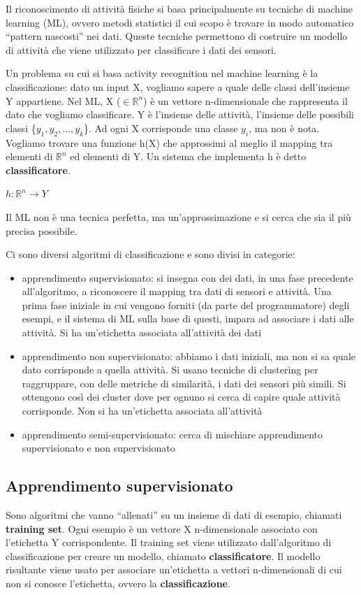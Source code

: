 Il riconoscimento di attività fisiche si basa principalmente su tecniche di machine learning (ML), ovvero metodi statistici il cui scopo è trovare in modo automatico “pattern nascosti” nei dati.
Queste tecniche permettono di costruire un modello di attività che viene utilizzato per classificare i dati dei sensori.

Un problema su cui si basa activity recognition nel machine learning è la classificazione: dato un input X, vogliamo sapere a quale 
delle classi dell'insieme Y appartiene.
Nel ML, X ($\in \mathbb{R}^n$) è un vettore n-dimensionale che rappresenta il dato che vogliamo classificare.
Y è l'insieme delle attività, l'insieme delle possibili classi \{$y_1, y_2, ..., y_k$\}.
Ad ogni X corrisponde una classe $y_i$, ma non è nota.
Vogliamo trovare una funzione h(X) che approssimi al meglio il mapping tra elementi di $\mathbb{R}^n$ ed elementi di Y. Un sistema che implementa h è detto \textbf{classificatore}.
\begin{center}
    $h: \mathbb{R}^n \rightarrow Y$
\end{center}

Il ML non è una tecnica perfetta, ma un'approssimazione e si cerca che sia il più precisa possibile.

Ci sono diversi algoritmi di classificazione e sono divisi in categorie:
\begin{itemize}
    \item apprendimento supervisionato: si insegna con dei dati, in una fase precedente all'algoritmo, a riconoscere il mapping tra dati di sensori e attività. Una prima fase iniziale in cui vengono forniti (da parte del programmatore) degli esempi, e il sistema di ML sulla base di questi, impara ad associare i dati alle attività. Si ha un'etichetta associata all'attività dei dati
    \item apprendimento non supervisionato: abbiamo i dati iniziali, ma non si sa quale dato corrisponde a quella attività. Si usano tecniche di clustering per raggruppare, con delle metriche di similarità, i dati dei sensori più simili. Si ottengono così dei cluster dove per ognuno si cerca di capire quale attività corrisponde. Non si ha un'etichetta associata all'attività
    \item apprendimento semi-supervisionato: cerca di mischiare apprendimento supervisionato e non supervisionato
\end{itemize} 

\subsection{Apprendimento supervisionato}
Sono algoritmi che vanno “allenati” su un insieme di dati di esempio, chiamati \textbf{training set}. 
Ogni esempio è un vettore X n-dimensionale associato con l’etichetta Y corrispondente.
Il training set viene utilizzato dall'algoritmo di classificazione per creare un modello, chiamato \textbf{classificatore}.
Il modello risultante viene usato per associare un'etichetta a vettori n-dimensionali di cui non si conosce l'etichetta, ovvero la \textbf{classificazione}. 

